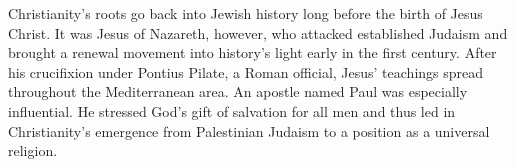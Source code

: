
\begin{partsummary}
Christianity’s roots go back into Jewish history long before the birth of Jesus Christ. It was Jesus
of Nazareth, however, who attacked established Judaism and brought a renewal movement into history’s
light early in the first century. After his crucifixion under Pontius Pilate, a Roman official,
Jesus’ teachings spread throughout the Mediterranean area. An apostle named Paul was especially
influential. He stressed God’s gift of salvation for all men and thus led in Christianity’s
emergence from Palestinian Judaism to a position as a universal religion.
\end{partsummary}

